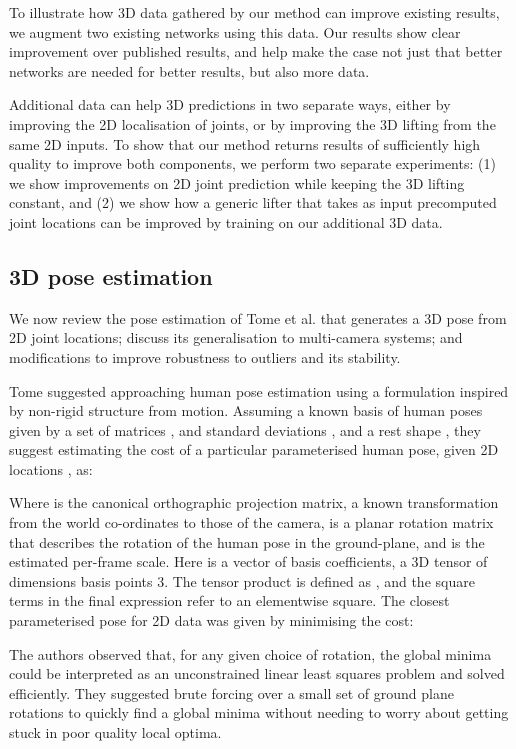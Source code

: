 \documentclass[10pt,twocolumn,letterpaper]{article}
\begin{document}
To illustrate how 3D data gathered by our method can improve existing results,
we augment two existing networks using this data. Our results show clear
improvement over published results, and help make the case not just that better
networks are needed for better results, but also more data.

Additional data can help 3D predictions in two separate ways, either
by improving the 2D localisation of joints, or by improving the 3D
lifting from the same 2D inputs. To show that our method returns
results of sufficiently high quality to improve both components, we
perform two separate experiments: (1) we show improvements on 2D joint
prediction while keeping the 3D lifting constant, and (2) we show how a
generic lifter that takes as input precomputed joint locations can be improved
by training on our additional 3D data.
\subsection{3D pose estimation}
 \label{sec:3D-pose-estimation}
 We now review the pose estimation of Tome et al.\cite{tome2017lifting} that
 generates a 3D pose from 2D joint locations; discuss its generalisation to
 multi-camera systems; and modifications to improve robustness to outliers and
 its stability.

 Tome \etal suggested approaching human pose estimation using a formulation
 inspired by non-rigid structure from motion. Assuming a known basis of human
 poses given by a set of matrices {, and standard deviations ,}  and a rest shape , they suggest
 estimating the cost of a particular parameterised human pose, given 2D {locations} , as:
 
 Where  is the canonical orthographic projection matrix,  a known
 transformation from the world co-ordinates to those of the camera, 
 is a planar rotation matrix that describes the rotation of the human pose in the
 ground-plane, and  is the estimated per-frame scale.
 Here  is a vector of basis coefficients,  a 3D tensor of dimensions basis
  points  3.
 The tensor product  is defined as , and the square terms in the final expression refer to an
 elementwise square. 
 The closest parameterised pose for 2D data  was {given by minimising the  cost}:
 
 The authors observed that, for any given choice of rotation, the global minima
 could be interpreted as an unconstrained linear least squares problem and
 solved efficiently. They suggested brute forcing over a small set of ground
 plane rotations to quickly find a global minima without needing to worry about
 getting stuck in poor quality local optima.
\end{document}
